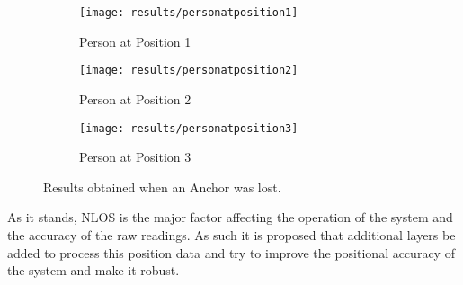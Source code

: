 \begin{figure}[h!]
    \centering
    \begin{subfigure}{0.45\textwidth}
            \texttt{[image: results/personatposition1]}
            \caption{Person at Position 1}
    \end{subfigure}
    \begin{subfigure}{0.45\textwidth}
            \texttt{[image: results/personatposition2]}
            \caption{Person at Position 2}
    \end{subfigure}
    \begin{subfigure}{0.45\textwidth}
            \texttt{[image: results/personatposition3]}
            \caption{Person at Position 3}
    \end{subfigure}
    \caption{Results obtained when an Anchor was lost.}
    \label{fig:persons}
\end{figure}
As it stands, NLOS is the major factor affecting the operation of the system and the accuracy of the raw readings.
As such it is proposed that additional layers be added to process this position data and try to improve the positional accuracy of the system and make it robust.

